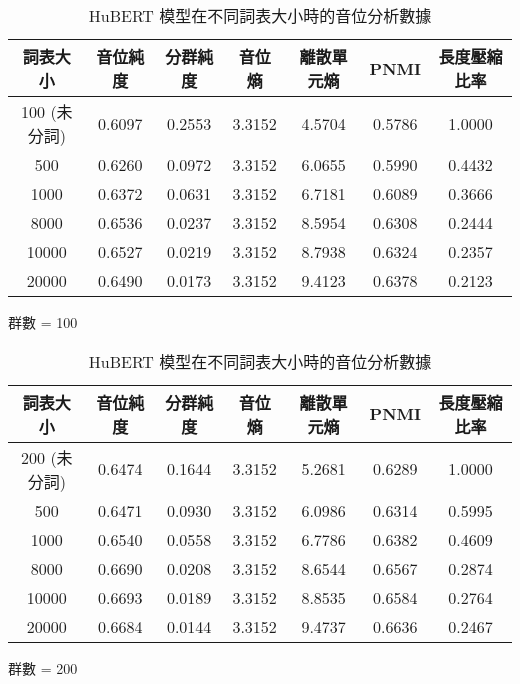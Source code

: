 \begin{table}[!htbp]
            \begin{subtable}[t]{\textwidth}
                \centering
                \begin{tabular}{|c|c|c|c|c|c|c|} \hline 
                        詞表大小  & 音位純度 & 分群純度 & 音位熵 & 離散單元熵 &    PNMI & 長度壓縮比率 \\ \hline 
 100 (未分詞)& 0.6097& 0.2553& 3.3152& 4.5704& 0.5786&1.0000\\ \hline 
                           500  &   0.6260   &  0.0972 &   3.3152  &  6.0655 & 0.5990 & 0.4432  \\ \hline %
                          1000  &   0.6372   &  0.0631 &   3.3152  &  6.7181 & 0.6089 & 0.3666  \\ \hline %
                          8000  &   0.6536   &  0.0237 &   3.3152  &  8.5954 & 0.6308 & 0.2444  \\ \hline %
                         10000  &   0.6527   &  0.0219 &   3.3152  &  8.7938 & 0.6324 & 0.2357  \\ \hline %
                         20000  &   0.6490   &  0.0173 &   3.3152  &  9.4123 & 0.6378 & 0.2123  \\ \hline %
                \end{tabular}
\caption{群數 = 100}
                \label{tab:ch4-hubert-phn-clu100}
            \end{subtable}        

            \jefftablesep        

            \begin{subtable}[t]{\textwidth}
                \centering
                \begin{tabular}{|c|c|c|c|c|c|c|} \hline 
                        詞表大小  & 音位純度 & 分群純度 & 音位熵 & 離散單元熵 &    PNMI & 長度壓縮比率 \\ \hline 
 200 (未分詞)& 0.6474& 0.1644& 3.3152& 5.2681& 0.6289&1.0000\\ \hline 
                           500  &   0.6471   &  0.0930 &   3.3152  &  6.0986 & 0.6314 & 0.5995  \\ \hline %
                          1000  &   0.6540   &  0.0558 &   3.3152  &  6.7786 & 0.6382 & 0.4609  \\ \hline %
                          8000  &   0.6690   &  0.0208 &   3.3152  &  8.6544 & 0.6567 & 0.2874  \\ \hline %
                         10000  &   0.6693   &  0.0189 &   3.3152  &  8.8535 & 0.6584 & 0.2764  \\ \hline %
                         20000  &   0.6684   &  0.0144 &   3.3152  &  9.4737 & 0.6636 & 0.2467  \\ \hline %
                \end{tabular}
\caption{群數 = 200}
                \label{tab:ch4-hubert-phn-clu200}
            \end{subtable}        

\caption{HuBERT 模型在不同詞表大小時的音位分析數據}
            \label{tab:hubert-phn-results}
        \end{table}

